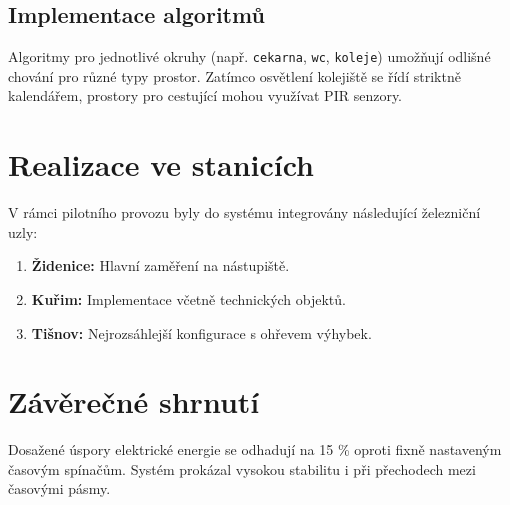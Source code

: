 \documentclass[12pt,a4paper]{article}
\begin{document}
\subsection{Implementace algoritmů}
Algoritmy pro jednotlivé okruhy (např. \texttt{cekarna}, \texttt{wc}, \texttt{koleje}) umožňují odlišné chování pro různé typy prostor. Zatímco osvětlení kolejiště se řídí striktně kalendářem, prostory pro cestující mohou využívat PIR senzory.

\lipsum[3-4]

\newpage
\section{Realizace ve stanicích}
V rámci pilotního provozu byly do systému integrovány následující železniční uzly:
\begin{enumerate}
    \item \textbf{Židenice:} Hlavní zaměření na nástupiště.
    \item \textbf{Kuřim:} Implementace včetně technických objektů.
    \item \textbf{Tišnov:} Nejrozsáhlejší konfigurace s ohřevem výhybek.
\end{enumerate}

\section{Závěrečné shrnutí}
Dosažené úspory elektrické energie se odhadují na 15 \% oproti fixně nastaveným časovým spínačům. Systém prokázal vysokou stabilitu i při přechodech mezi časovými pásmy.

\lipsum[5-6]
\end{document}
